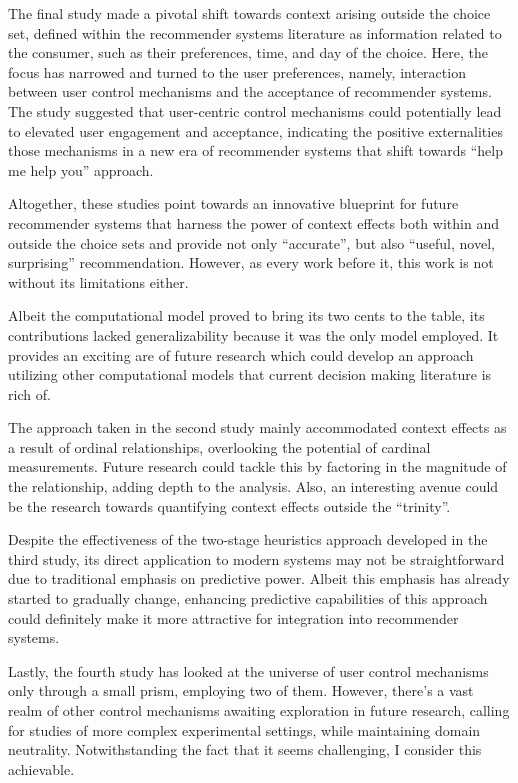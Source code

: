 \documentclass[a4paper,12pt]{article}
\begin{document}
The final study made a pivotal shift towards context arising outside the choice set, defined within the recommender systems literature as information related to the consumer, such as their preferences, time, and day of the choice. Here, the focus has narrowed and turned to the user preferences, namely, interaction between user control mechanisms and the acceptance of recommender systems. The study suggested that user-centric control mechanisms could potentially lead to elevated user engagement and acceptance, indicating the positive externalities those mechanisms in a new era of recommender systems that shift towards ``help me help you'' approach.

Altogether, these studies point towards an innovative blueprint for future recommender systems that harness the power of context effects both within and outside the choice sets and provide not only ``accurate'', but also ``useful, novel, surprising'' recommendation. However, as every work before it, this work is not without its limitations either.

Albeit the computational model proved to bring its two cents to the table, its contributions lacked generalizability because it was the only model employed. It provides an exciting are of future research which could develop an approach utilizing other computational models that current decision making literature is rich of. 

The approach taken in the second study mainly accommodated context effects as a result of ordinal relationships, overlooking the potential of cardinal measurements. Future research could tackle this by factoring in the magnitude of the relationship, adding depth to the analysis. Also, an interesting avenue could be the research towards quantifying context effects outside the ``trinity''. 

Despite the effectiveness of the two-stage heuristics approach developed in the third study, its direct application to modern systems may not be straightforward due to traditional emphasis on predictive power. Albeit this emphasis has already started to gradually change, enhancing predictive capabilities of this approach could definitely make it more attractive for integration into recommender systems.

Lastly, the fourth study has looked at the universe of user control mechanisms only through a small prism, employing two of them. However, there's a vast realm of other control mechanisms awaiting exploration in future research, calling for studies of more complex experimental settings, while maintaining domain neutrality. Notwithstanding the fact that it seems challenging, I consider this achievable.
\end{document}
